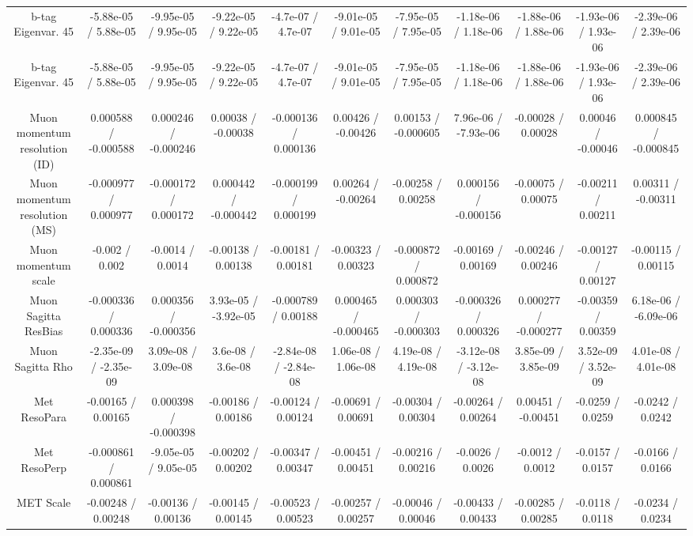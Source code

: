 \begin{table}[htbp]
\begin{center}
\begin{tabular}{|c|c|c|c|c|c|c|c|c|c|c|}
  b-tag Eigenvar. 45 & -5.88e-05 / 5.88e-05 & -9.95e-05 / 9.95e-05 & -9.22e-05 / 9.22e-05 & -4.7e-07 / 4.7e-07 & -9.01e-05 / 9.01e-05 & -7.95e-05 / 7.95e-05 & -1.18e-06 / 1.18e-06 & -1.88e-06 / 1.88e-06 & -1.93e-06 / 1.93e-06 & -2.39e-06 / 2.39e-06 \\ 
  b-tag Eigenvar. 45 & -5.88e-05 / 5.88e-05 & -9.95e-05 / 9.95e-05 & -9.22e-05 / 9.22e-05 & -4.7e-07 / 4.7e-07 & -9.01e-05 / 9.01e-05 & -7.95e-05 / 7.95e-05 & -1.18e-06 / 1.18e-06 & -1.88e-06 / 1.88e-06 & -1.93e-06 / 1.93e-06 & -2.39e-06 / 2.39e-06 \\ 
  Muon momentum resolution (ID) & 0.000588 / -0.000588 & 0.000246 / -0.000246 & 0.00038 / -0.00038 & -0.000136 / 0.000136 & 0.00426 / -0.00426 & 0.00153 / -0.000605 & 7.96e-06 / -7.93e-06 & -0.00028 / 0.00028 & 0.00046 / -0.00046 & 0.000845 / -0.000845 \\ 
  Muon momentum resolution (MS) & -0.000977 / 0.000977 & -0.000172 / 0.000172 & 0.000442 / -0.000442 & -0.000199 / 0.000199 & 0.00264 / -0.00264 & -0.00258 / 0.00258 & 0.000156 / -0.000156 & -0.00075 / 0.00075 & -0.00211 / 0.00211 & 0.00311 / -0.00311 \\ 
  Muon momentum scale & -0.002 / 0.002 & -0.0014 / 0.0014 & -0.00138 / 0.00138 & -0.00181 / 0.00181 & -0.00323 / 0.00323 & -0.000872 / 0.000872 & -0.00169 / 0.00169 & -0.00246 / 0.00246 & -0.00127 / 0.00127 & -0.00115 / 0.00115 \\ 
  Muon Sagitta ResBias & -0.000336 / 0.000336 & 0.000356 / -0.000356 & 3.93e-05 / -3.92e-05 & -0.000789 / 0.00188 & 0.000465 / -0.000465 & 0.000303 / -0.000303 & -0.000326 / 0.000326 & 0.000277 / -0.000277 & -0.00359 / 0.00359 & 6.18e-06 / -6.09e-06 \\ 
  Muon Sagitta Rho & -2.35e-09 / -2.35e-09 & 3.09e-08 / 3.09e-08 & 3.6e-08 / 3.6e-08 & -2.84e-08 / -2.84e-08 & 1.06e-08 / 1.06e-08 & 4.19e-08 / 4.19e-08 & -3.12e-08 / -3.12e-08 & 3.85e-09 / 3.85e-09 & 3.52e-09 / 3.52e-09 & 4.01e-08 / 4.01e-08 \\ 
  Met ResoPara & -0.00165 / 0.00165 & 0.000398 / -0.000398 & -0.00186 / 0.00186 & -0.00124 / 0.00124 & -0.00691 / 0.00691 & -0.00304 / 0.00304 & -0.00264 / 0.00264 & 0.00451 / -0.00451 & -0.0259 / 0.0259 & -0.0242 / 0.0242 \\ 
  Met ResoPerp & -0.000861 / 0.000861 & -9.05e-05 / 9.05e-05 & -0.00202 / 0.00202 & -0.00347 / 0.00347 & -0.00451 / 0.00451 & -0.00216 / 0.00216 & -0.0026 / 0.0026 & -0.0012 / 0.0012 & -0.0157 / 0.0157 & -0.0166 / 0.0166 \\ 
  MET Scale & -0.00248 / 0.00248 & -0.00136 / 0.00136 & -0.00145 / 0.00145 & -0.00523 / 0.00523 & -0.00257 / 0.00257 & -0.00046 / 0.00046 & -0.00433 / 0.00433 & -0.00285 / 0.00285 & -0.0118 / 0.0118 & -0.0234 / 0.0234 \\ 

\end{tabular}
\end{center}
\end{table}
